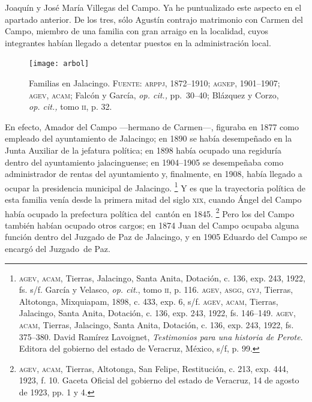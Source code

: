\documentclass[14pt,twoside,final]{extbook} %
\let\oldfootnote\footnote
\renewcommand\footnote[1]{%
\oldfootnote{\hspace{1mm}#1}}
\begin{document}
Joaquín y José María Villegas del Campo. Ya he puntualizado este aspecto en el apartado anterior. De los tres, sólo Agustín contrajo matrimonio con Carmen del Campo, miembro de una familia con gran arraigo en la localidad, cuyos integrantes habían llegado a detentar puestos en la administración local.
\begin{figure}
\centering
\texttt{[image: arbol]}
\caption[Familias en Jalacingo]{Familias en Jalacingo. \textsc{Fuente:} \textsc{arppj, 1872--1910}; \textsc{agnep}, 1901--1907; \textsc{agev, acam}; Falcón y García, \emph{op. cit.,} pp.~30--40; Blázquez y Corzo, \emph{op. cit.,} tomo \textsc{ii}, p. 32.}
\label{fig:arbol-genealogico}
\end{figure}
En efecto, Amador del Campo ---hermano de Carmen---, figuraba en 1877 como empleado del ayuntamiento de Jalacingo; en 1890 se había desempeñado en la Junta Auxiliar de la jefatura política; en 1898 había ocupado una regiduría dentro del ayuntamiento jalacinguense; en 1904--1905 se desempeñaba como administrador de rentas del ayuntamiento y, finalmente, en 1908, había llegado a ocupar la presidencia municipal de Jalacingo.\footnote{\textsc{agev, acam}, Tierras, Jalacingo, Santa Anita, Dotación, c. 136, exp. 243, 1922, fs. s/f. García y Velasco, \emph{op. cit.}, tomo \textsc{ii}, p. 116. \textsc{agev, asgg, gyj}, Tierras, Altotonga, Mixquiapam, 1898, c. 433, exp. 6, s/f. \textsc{agev, acam}, Tierras, Jalacingo, Santa Anita, Dotación, c. 136, exp. 243, 1922, fs. 146--149. \textsc{agev, acam}, Tierras, Jalacingo, Santa Anita, Dotación, c. 136, exp. 243, 1922, fs. 375--380. David Ramírez Lavoignet, \emph{Testimonios para una historia de Perote}. Editora del gobierno del estado de Veracruz, México, s/f, p. 99.} Y es que la trayectoria política de esta familia venía desde la primera mitad del siglo \textsc{xix}, cuando Ángel del Campo había ocupado la prefectura política del~cantón en 1845.\footnote{\textsc{agev, acam}, Tierras, Altotonga, San Felipe, Restitución, c. 213, exp. 444, 1923, f. 10. Gaceta Oficial del gobierno del estado de Veracruz, 14 de agosto de 1923, pp. 1 y 4.} Pero los del Campo también habían ocupado otros cargos; en 1874 Juan del Campo ocupaba alguna función dentro del Juzgado de Paz de Jalacingo, y en 1905 Eduardo del Campo se encargó del Juzgado~de Paz.
\end{document}
